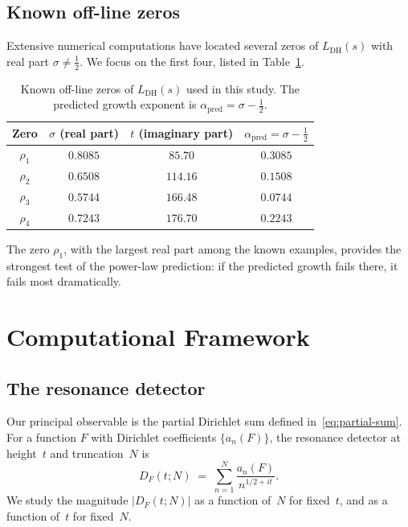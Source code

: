 \documentclass[11pt]{amsart}
\theoremstyle{definition}
\theoremstyle{remark}
\renewcommand{\DH}{\mathrm{DH}}
\newcommand{\abs}[1]{\lvert #1 \rvert}
\begin{document}
\subsection{Known off-line zeros}

Extensive numerical computations
\cite{Spira1994,BalanzarioSanchezOrtiz2007} have located several zeros
of $L_{\DH}(s)$ with real part $\sigma \neq \tfrac{1}{2}$.  We focus
on the first four, listed in Table~\ref{tab:offline-zeros}.

\begin{table}[ht]
\centering
\caption{Known off-line zeros of $L_{\DH}(s)$ used in this study.
  The predicted growth exponent is $\alpha_{\mathrm{pred}} = \sigma - \tfrac{1}{2}$.}
\label{tab:offline-zeros}
\begin{tabular}{@{}cccc@{}}
\toprule
Zero & $\sigma$ (real part) & $t$ (imaginary part) &
  $\alpha_{\mathrm{pred}} = \sigma - \tfrac{1}{2}$ \\
\midrule
$\rho_1$ & $0.8085$ & $85.70$  & $0.3085$ \\
$\rho_2$ & $0.6508$ & $114.16$ & $0.1508$ \\
$\rho_3$ & $0.5744$ & $166.48$ & $0.0744$ \\
$\rho_4$ & $0.7243$ & $176.70$ & $0.2243$ \\
\bottomrule
\end{tabular}
\end{table}

The zero $\rho_1$, with the largest real part among the known
examples, provides the strongest test of the power-law prediction: if
the predicted growth fails there, it fails most dramatically.

\section{Computational Framework}\label{sec:framework}

\subsection{The resonance detector}

Our principal observable is the partial Dirichlet sum defined
in~\eqref{eq:partial-sum}.  For a function $F$ with Dirichlet
coefficients $\{a_n(F)\}$, the resonance detector at height~$t$ and
truncation~$N$ is
\begin{equation}\label{eq:resonance}
  D_F(t; N) \;=\; \sum_{n=1}^{N} \frac{a_n(F)}{n^{1/2+it}}.
\end{equation}
We study the magnitude $\abs{D_F(t;N)}$ as a function of~$N$ for
fixed~$t$, and as a function of~$t$ for fixed~$N$.
\end{document}
